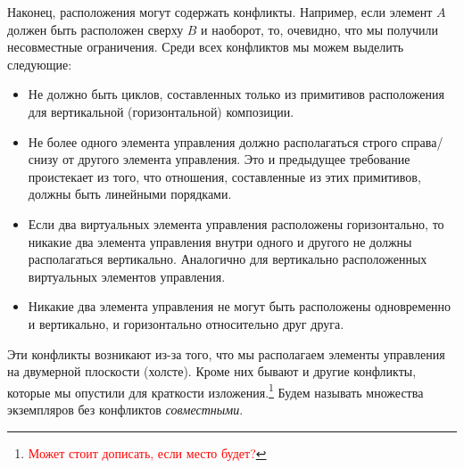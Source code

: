 Наконец, расположения могут содержать конфликты. Например, если элемент $A$ должен быть расположен  сверху $B$ и наоборот,
то, очевидно, что мы получили несовместные ограничения. Среди всех конфликтов мы можем выделить следующие:


\begin{itemize}
\item Не должно быть циклов, составленных только из примитивов расположения для вертикальной (горизонтальной) композиции.
\item Не более одного элемента управления должно располагаться строго справа/снизу от другого элемента управления.
Это и предыдущее требование проистекает из того, что отношения, составленные из этих примитивов, должны быть линейными порядками.

\item Если два виртуальных элемента  управления расположены горизонтально,  то никакие два элемента управления внутри одного и  другого не должны располагаться вертикально. Аналогично для вертикально расположенных виртуальных элементов управления.
\item Никакие два элемента управления не могут быть расположены одновременно и вертикально, и горизонтально относительно друг друга.
\end{itemize}


Эти конфликты возникают из-за того, что мы располагаем элементы управления на двумерной плоскости (холсте).
Кроме них бывают и другие конфликты, которые мы опустили для краткости изложения.\footnote{\textcolor{red}{Может стоит дописать, если место будет?}}
Будем называть множества экземпляров без конфликтов \emph{совместными}.

